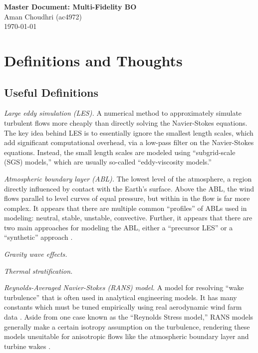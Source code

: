 \documentclass[12pt]{article}
\newcommand{\term}[1]{\emph{#1.}}
\begin{document}
\begin{flushleft}
\textbf{Master Document: Multi-Fidelity BO} \\
Aman Choudhri (ac4972) \\
\today
\end{flushleft}

\tableofcontents
\newpage

\section{Definitions and Thoughts}
\subsection{Useful Definitions}
\term{Large eddy simulation (LES)}
A numerical method to approximately simulate turbulent flows more cheaply than
directly solving the Navier-Stokes equations. The key idea behind LES is to
essentially ignore the smallest length scales, which add significant
computational overhead, via a low-pass filter on the Navier-Stokes equations.
Instead, the small length scales are modeled using ``subgrid-scale (SGS)
models,'' which are usually so-called ``eddy-viscosity models.''

\term{Atmospheric boundary layer (ABL)}
The lowest level of the atmosphere, a region directly influenced by contact
with the Earth's surface. Above the ABL, the wind flows parallel to level
curves of equal pressure, but within in the flow is far more complex. It
appears that there are multiple common ``profiles'' of ABLs used in modeling:
neutral, stable, unstable, convective. Further, it appears that there are two
main approaches for modeling the ABL, either a ``precursor LES'' or a
``synthetic'' approach \cite{bretonSurveyModellingMethods2017,
mehtaLargeEddySimulation2014}.

\term{Gravity wave effects} 

\term{Thermal stratification} 

\term{Reynolds-Averaged Navier-Stokes (RANS) model}
A model for resolving ``wake turbulence'' that is often used in analytical
engineering models. It has many constants which must be tuned empirically using
real aerodynamic wind farm data \cite[pg.2]{mehtaLargeEddySimulation2014}.
Aside from one case known as the ``Reynolds Stress model,'' RANS models
generally make a certain isotropy assumption on the turbulence, rendering these
models unsuitable for anisotropic flows like the atmospheric boundary layer and
turbine wakes \cite[pg.3]{mehtaLargeEddySimulation2014}.
\end{document}
